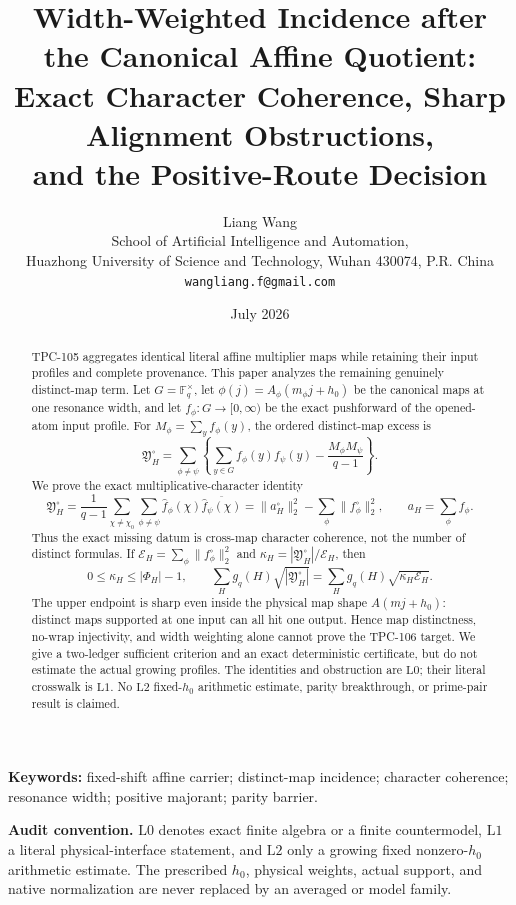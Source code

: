 \documentclass[11pt]{article}
\title{Width-Weighted Incidence after the Canonical Affine Quotient:\\
Exact Character Coherence, Sharp Alignment Obstructions,\\
and the Positive-Route Decision}
\author{Liang Wang\\
School of Artificial Intelligence and Automation,\\
Huazhong University of Science and Technology, Wuhan 430074, P.R. China\\
\texttt{wangliang.f@gmail.com}}
\date{July 2026}
\theoremstyle{remark}
\newcommand{\F}{\mathbb F}
\newcommand{\Lzero}{\mathrm{L0}}
\newcommand{\Lone}{\mathrm{L1}}
\newcommand{\Ltwo}{\mathrm{L2}}
\newcommand{\YH}{\mathfrak Y_H^\circ}
\begin{document}
\maketitle

\begin{abstract}
TPC-105 aggregates identical literal affine multiplier maps while
retaining their input profiles and complete provenance.  This paper
analyzes the remaining genuinely distinct-map term.  Let
\(G=\F_q^\times\), let
\(\phi(j)=A_\phi(m_\phi j+h_0)\) be the canonical maps at one
resonance width, and let \(f_\phi:G\to[0,\infty)\) be the exact
pushforward of the opened-atom input profile.  For
\(M_\phi=\sum_yf_\phi(y)\), the ordered distinct-map excess is
\[
 \YH
 =
 \sum_{\phi\ne\psi}
 \left\{
  \sum_{y\in G}f_\phi(y)f_\psi(y)
  -\frac{M_\phi M_\psi}{q-1}
 \right\}.
\]
We prove the exact multiplicative-character identity
\[
 \YH
 =
 \frac1{q-1}\sum_{\chi\ne\chi_0}
 \sum_{\phi\ne\psi}
 \widehat f_\phi(\chi)
 \overline{\widehat f_\psi(\chi)}
 =
 \|a_H^\circ\|_2^2
 -\sum_\phi\|f_\phi^\circ\|_2^2,
\qquad a_H=\sum_\phi f_\phi.
\]
Thus the exact missing datum is cross-map character coherence, not
the number of distinct formulas.  If
\(\mathcal E_H=\sum_\phi\|f_\phi^\circ\|_2^2\) and
\(\kappa_H=|\YH|/\mathcal E_H\), then
\[
 0\le\kappa_H\le |\Phi_H|-1,
\qquad
 \sum_Hg_q(H)\sqrt{|\YH|}
 =
 \sum_Hg_q(H)\sqrt{\kappa_H\mathcal E_H}.
\]
The upper endpoint is sharp even inside the physical map shape
\(A(mj+h_0)\): distinct maps supported at one input can all hit one
output.  Hence map distinctness, no-wrap injectivity, and width
weighting alone cannot prove the TPC-106 target.  We give a
two-ledger sufficient criterion and an exact deterministic
certificate, but do not estimate the actual growing profiles.
The identities and obstruction are \(\Lzero\); their literal
crosswalk is \(\Lone\).  No \(\Ltwo\) fixed-\(h_0\) arithmetic
estimate, parity breakthrough, or prime-pair result is claimed.
\end{abstract}

\noindent\textbf{Keywords:} fixed-shift affine carrier;
distinct-map incidence; character coherence; resonance width;
positive majorant; parity barrier.

\medskip
\noindent\textbf{Audit convention.}
\(\Lzero\) denotes exact finite algebra or a finite countermodel,
\(\Lone\) a literal physical-interface statement, and \(\Ltwo\)
only a growing fixed nonzero-\(h_0\) arithmetic estimate.  The
prescribed \(h_0\), physical weights, actual support, and native
normalization are never replaced by an averaged or model family.
\end{document}
